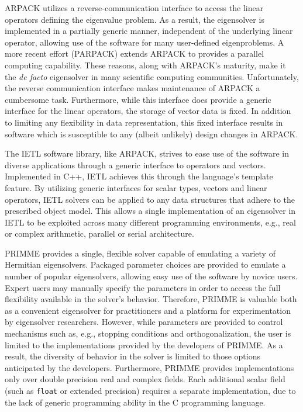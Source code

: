 \documentclass[acmtoms,acmnow]{acmtrans2m}
\begin{document}
ARPACK utilizes a reverse-communication interface to access the linear operators defining
the eigenvalue problem. As a result, the eigensolver is implemented in a partially generic
manner, independent of the underlying linear operator, allowing use of the software for
many user-defined eigenproblems. A more recent effort (PARPACK) extends ARPACK to provides
a parallel computing capability. These reasons, along with ARPACK's maturity, make it the
\textit{de facto} eigensolver in many scientific computing communities. Unfortunately, the
reverse communication interface makes maintenance of ARPACK a cumbersome task.
Furthermore, while this interface does provide a generic interface for the linear
operators, the storage of vector data is fixed. In addition to limiting any flexibility in
data representation, this fixed interface results in software which is susceptible to any
(albeit unlikely) design changes in ARPACK.

The IETL software library, like ARPACK, strives to ease use of the software in diverse
applications through a generic interface to operators and vectors. Implemented in C++,
IETL achieves this through the language's template feature. By utilizing generic
interfaces for scalar types, vectors and linear operators, IETL solvers can be applied to
any data structures that adhere to the prescribed object model. This allows a single
implementation of an eigensolver in IETL to be exploited across many different programming
environments, e.g., real or complex arithmetic, parallel or serial architecture.

PRIMME provides a single, flexible solver capable of emulating a variety of Hermitian
eigensolvers. Packaged parameter choices are provided to emulate a number of popular
eigensolvers, allowing easy use of the software by novice users. Expert users may manually
specify the parameters in order to access the full flexibility available in the solver's
behavior. Therefore, PRIMME is valuable both as a convenient eigensolver for practitioners
and a platform for experimentation by eigensolver researchers. However, while parameters
are provided to control mechanisms such as, e.g., stopping conditions and
orthogonalization, the user is limited to the implementations provided by the developers
of PRIMME. As a result, the diversity of behavior in the solver is limited to those options
anticipated by the developers. Furthermore, PRIMME provides implementations only over
double precision real and complex fields. Each additional scalar field (such as
\texttt{float} or extended precision) requires a separate implementation, due to the lack
of generic programming ability in the C programming language.
\end{document}

